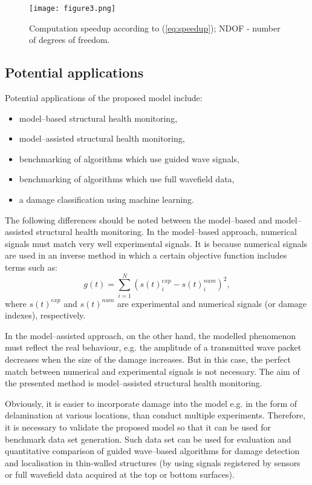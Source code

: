 \documentclass[12pt]{iopart}
\begin{document}
\begin{figure} [h!]
	\centering
	\texttt{[image: figure3.png]}	
	\caption{Computation speedup according to (\ref{eq:speedup}); NDOF - number of degrees of freedom.}
	\label{fig:speedup}
\end{figure}
\newpage

\subsection{Potential applications}

Potential applications of the proposed model include:
\begin{itemize}
	\item model--based structural health monitoring,
	\item model--assisted structural health monitoring,
	\item benchmarking of algorithms which use guided wave signals,
	\item benchmarking of algorithms which use full wavefield data,
	\item a damage classification using machine learning.
\end{itemize}
The following differences should be noted  between the model--based and model--assisted structural health monitoring.
In the model--based approach, numerical signals must match very well experimental signals. It is because numerical signals are used in an inverse method in which a certain objective function includes terms such as:
\begin{equation}
g(t) = \sum_{i=1}^{N} \left(s(t)_i^{exp} - s(t)_i^{num}\right)^2,
\label{eq:obj_fun}
\end{equation}
where $s(t)^{exp}$ and $s(t)^{num}$ are experimental and numerical signals (or damage indexes), respectively.

In the model--assisted approach, on the other hand, the modelled phenomenon must reflect the real behaviour, e.g. the amplitude of a transmitted wave packet decreases when the size of the damage increases. But in this case, the perfect match between numerical and experimental signals is not necessary. The aim of the presented method is model--assisted structural health monitoring.

Obviously, it is easier to incorporate damage into the model e.g. in the form of delamination at various locations, than conduct multiple experiments. Therefore, it is necessary to validate the proposed model so that it can be used for benchmark data set generation. Such data set can be used for evaluation and quantitative comparison of guided wave--based algorithms for damage detection and localisation in thin-walled structures (by using signals registered by sensors or full wavefield data acquired at the top or bottom surfaces).
\end{document}
